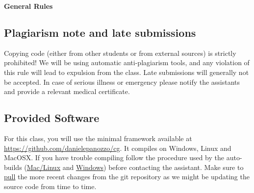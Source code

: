 \documentclass[11pt]{report}
\begin{document}




\hspace{50pt}

\begin{center}

{\Huge \textbf{General Rules}}\\
\vspace{10pt}
\end{center}

\subsection*{Plagiarism note and late submissions}
Copying code (either from other students or from external sources) is strictly prohibited! We will be using automatic anti-plagiarism tools, and any violation of this rule will lead to expulsion from the class. Late submissions will generally not be accepted. In case of serious illness or emergency please notify the assistants and provide a relevant medical certificate.

\subsection*{Provided Software}
For this class, you will use the minimal framework available at  \href{https://github.com/danielepanozzo/cg}{https://github.com/danielepanozzo/cg}. It compiles on Windows, Linux and MacOSX. If you have trouble compiling follow the procedure used by the auto-builds (\href{https://travis-ci.org/danielepanozzo/cg}{Mac/Linux} and \href{https://ci.appveyor.com/project/danielepanozzo/cg}{Windows}) before contacting the assistant. Make sure to \href{http://git-scm.com/book/en/v2/Git-Basics-Getting-a-Git-Repository}{pull} the more recent changes from the git repository as we might be updating the source code from time to time.
\end{document}
